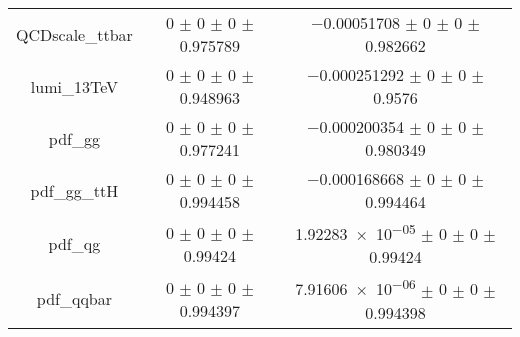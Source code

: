 \begin{table}
\begin{tabular}{ccc}
QCDscale\_ttbar & \num{0} $\pm$ \num{0} $\pm$ \num{0} $\pm$ \num{0.975789} & \num{-0.00051708} $\pm$ \num{0} $\pm$ \num{0} $\pm$ \num{0.982662}\\
lumi\_13TeV & \num{0} $\pm$ \num{0} $\pm$ \num{0} $\pm$ \num{0.948963} & \num{-0.000251292} $\pm$ \num{0} $\pm$ \num{0} $\pm$ \num{0.9576}\\
pdf\_gg & \num{0} $\pm$ \num{0} $\pm$ \num{0} $\pm$ \num{0.977241} & \num{-0.000200354} $\pm$ \num{0} $\pm$ \num{0} $\pm$ \num{0.980349}\\
pdf\_gg\_ttH & \num{0} $\pm$ \num{0} $\pm$ \num{0} $\pm$ \num{0.994458} & \num{-0.000168668} $\pm$ \num{0} $\pm$ \num{0} $\pm$ \num{0.994464}\\
pdf\_qg & \num{0} $\pm$ \num{0} $\pm$ \num{0} $\pm$ \num{0.99424} & \num{1.92283e-05} $\pm$ \num{0} $\pm$ \num{0} $\pm$ \num{0.99424}\\
pdf\_qqbar & \num{0} $\pm$ \num{0} $\pm$ \num{0} $\pm$ \num{0.994397} & \num{7.91606e-06} $\pm$ \num{0} $\pm$ \num{0} $\pm$ \num{0.994398}\\
\bottomrule
\end{tabular}
\end{table}